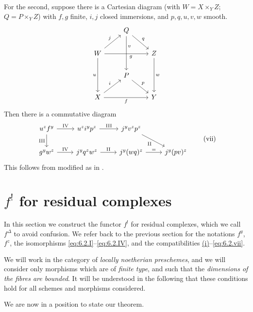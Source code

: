 For the second, suppose there is a Cartesian diagram (with $W = X\times_{Y} Z$; $Q = P\times_{Y} Z$) with $f,g$ finite, $i,j$ closed immersions, and $p,q,u,v,w$ smooth.
\[
\begin{tikzcd}
	& Q \arrow[dd, "v", pos=0.3] \arrow[rd, "q"] & \\
	W \arrow[ur, "j"] \arrow[rr, "g"', pos=0.6] \arrow[dd, "u"'] & & Z \arrow[dd, "w"] \\
	& P\arrow[rd, "p"] & \\
	X \arrow[ur, "i"] \arrow[rr, "f"'] & & Y
\end{tikzcd}
\]
Then there is a commutative diagram
\[
\begin{tikzcd}
u^{z}f^{y} \ar[r,"\mathrm{IV}"] \ar[d,"\mathrm{III}"'] & u^{z}i^{y}p^{z} \ar[r,"\mathrm{III}"] & j^{y}v^{z}p^{z}  \ar[dr,"\mathrm{II}"']\\
g^{y}w^{z} \ar[r,"\mathrm{IV}"] & j^{y}q^{z}w^{z} \ar[r,"\mathrm{II}"] & j^{y}(wq)^{z} \ar[r,"="]& j^{y}(pv)^{z}
\end{tikzcd}
\tag{vii}\label{eq:6.2.vii}
\]
This follows from  modified as in .

\par\endgroup

\section{$f^{!}$ for residual complexes}\label{sec:6.3}
\begingroup
\setlength{\emergencystretch}{2em}

In this section we construct the functor $f^{!}$ for residual complexes, which we call $f^{\Delta}$ to avoid confusion. We refer back to the previous section for the notations $f^{y}$, $f^{z}$, the isomorphisms \eqref{eq:6.2.I}--\eqref{eq:6.2.IV}, and the compatibilities \hyperref[compat:6.2.i]{(i)}--\eqref{eq:6.2.vii}.

We will work in the category of \emph{locally noetherian preschemes}, and we will consider only morphisms which are of \emph{finite type}, and such that the \emph{dimensions of the fibres are bounded}. It will be understood in the following that these conditions hold for all schemes and morphisms considered.

We are now in a position to state our theorem.

